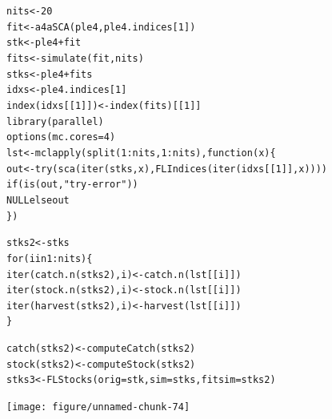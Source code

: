 \documentclass[a4paper,english,10pt]{article}\usepackage[]{graphicx}\usepackage[]{color}
\makeatletter
\newcommand{\hlnum}[1]{\textcolor[rgb]{0.2,0.2,0.2}{#1}}%
\newcommand{\hlstr}[1]{\textcolor[rgb]{0.2,0.2,0.2}{#1}}%
\newcommand{\hlopt}[1]{\textcolor[rgb]{0.2,0.2,0.2}{#1}}%
\newcommand{\hlstd}[1]{\textcolor[rgb]{0,0,0}{#1}}%
\newcommand{\hlkwa}[1]{\textcolor[rgb]{0.361,0.506,0.596}{#1}}%
\newcommand{\hlkwb}[1]{\textcolor[rgb]{0.361,0.506,0.596}{#1}}%
\newcommand{\hlkwc}[1]{\textcolor[rgb]{0.361,0.506,0.596}{#1}}%
\newcommand{\hlkwd}[1]{\textcolor[rgb]{0.361,0.506,0.596}{#1}}%
\newenvironment{kframe}{%
 \def\at@end@of@kframe{}%
 \ifinner\ifhmode%
  \def\at@end@of@kframe{\end{minipage}}%
  \begin{minipage}{\columnwidth}%
 \fi\fi%
 \def\FrameCommand##1{\hskip\@totalleftmargin \hskip-\fboxsep
 \colorbox{shadecolor}{##1}\hskip-\fboxsep
     \hskip-\linewidth \hskip-\@totalleftmargin \hskip\columnwidth}%
 \MakeFramed {\advance\hsize-\width
   \@totalleftmargin\z@ \linewidth\hsize
   \@setminipage}}%
 {\par\unskip\endMakeFramed%
 \at@end@of@kframe}
\newenvironment{knitrout}{}{} %
\makeatother
\begin{document}
\begin{knitrout}
\color{fgcolor}\begin{kframe}
\begin{alltt}
\hlstd{nits} \hlkwb{<-} \hlnum{20}
\hlstd{fit} \hlkwb{<-} \hlkwd{a4aSCA}\hlstd{(ple4, ple4.indices[}\hlnum{1}\hlstd{])}
\hlstd{stk} \hlkwb{<-} \hlstd{ple4} \hlopt{+} \hlstd{fit}
\hlstd{fits} \hlkwb{<-} \hlkwd{simulate}\hlstd{(fit, nits)}
\hlstd{stks} \hlkwb{<-} \hlstd{ple4} \hlopt{+} \hlstd{fits}
\hlstd{idxs} \hlkwb{<-} \hlstd{ple4.indices[}\hlnum{1}\hlstd{]}
\hlkwd{index}\hlstd{(idxs[[}\hlnum{1}\hlstd{]])} \hlkwb{<-} \hlkwd{index}\hlstd{(fits)[[}\hlnum{1}\hlstd{]]}
\hlkwd{library}\hlstd{(parallel)}
\hlkwd{options}\hlstd{(}\hlkwc{mc.cores} \hlstd{=} \hlnum{4}\hlstd{)}
\hlstd{lst} \hlkwb{<-} \hlkwd{mclapply}\hlstd{(}\hlkwd{split}\hlstd{(}\hlnum{1}\hlopt{:}\hlstd{nits,} \hlnum{1}\hlopt{:}\hlstd{nits),} \hlkwa{function}\hlstd{(}\hlkwc{x}\hlstd{) \{}
    \hlstd{out} \hlkwb{<-} \hlkwd{try}\hlstd{(}\hlkwd{sca}\hlstd{(}\hlkwd{iter}\hlstd{(stks, x),} \hlkwd{FLIndices}\hlstd{(}\hlkwd{iter}\hlstd{(idxs[[}\hlnum{1}\hlstd{]], x))))}
    \hlkwa{if} \hlstd{(}\hlkwd{is}\hlstd{(out,} \hlstr{"try-error"}\hlstd{))}
        \hlkwa{NULL else} \hlstd{out}
\hlstd{\})}

\hlstd{stks2} \hlkwb{<-} \hlstd{stks}
\hlkwa{for} \hlstd{(i} \hlkwa{in} \hlnum{1}\hlopt{:}\hlstd{nits) \{}
    \hlkwd{iter}\hlstd{(}\hlkwd{catch.n}\hlstd{(stks2), i)} \hlkwb{<-} \hlkwd{catch.n}\hlstd{(lst[[i]])}
    \hlkwd{iter}\hlstd{(}\hlkwd{stock.n}\hlstd{(stks2), i)} \hlkwb{<-} \hlkwd{stock.n}\hlstd{(lst[[i]])}
    \hlkwd{iter}\hlstd{(}\hlkwd{harvest}\hlstd{(stks2), i)} \hlkwb{<-} \hlkwd{harvest}\hlstd{(lst[[i]])}
\hlstd{\}}
\end{alltt}


{\ttfamily\noindent\bfseries{}}\begin{alltt}
\hlkwd{catch}\hlstd{(stks2)} \hlkwb{<-} \hlkwd{computeCatch}\hlstd{(stks2)}
\hlkwd{stock}\hlstd{(stks2)} \hlkwb{<-} \hlkwd{computeStock}\hlstd{(stks2)}
\hlstd{stks3} \hlkwb{<-} \hlkwd{FLStocks}\hlstd{(}\hlkwc{orig} \hlstd{= stk,} \hlkwc{sim} \hlstd{= stks,} \hlkwc{fitsim} \hlstd{= stks2)}
\end{alltt}
\end{kframe}
\end{knitrout}


\begin{knitrout}
\color{fgcolor}

{\centering \texttt{[image: figure/unnamed-chunk-74]} 

}



\end{knitrout}
\end{document}
